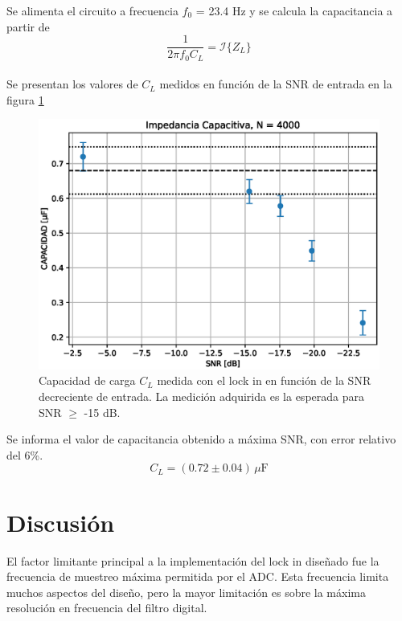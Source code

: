 \documentclass[11pt,a4paper]{extarticle}
\begin{document}
\begin{multicols}{2}
Se alimenta el circuito a frecuencia $f_0$ = 23.4 Hz y se calcula la capacitancia a partir de
\begin{equation*}
	\frac{1}{2\pi f_0 C_L} = \mathcal I \{Z_L\}
\end{equation*}\\[-1em]

Se presentan los valores de $C_L$ medidos en función de la SNR de entrada en la figura \ref{fig:CvsSNR}\\ 

\begin{figure}[H]
	\centering
	\includegraphics[width=\linewidth]{Images/capacitor4000.eps}
	\caption{Capacidad de carga $C_L$ medida con 
	el lock in en función de la SNR decreciente de entrada.
	La medición adquirida es la esperada para SNR $\ge$ -15 dB.}
	\label{fig:CvsSNR}
\end{figure}

Se informa el valor de capacitancia obtenido a máxima SNR, con error relativo del 6\%.
\begin{equation*}
	C_L = \left(0.72 \pm 0.04\right) \, \mu \mathrm F
\end{equation*}

\section{Discusión}

El factor limitante principal a la implementación del lock in diseñado fue la frecuencia de muestreo máxima permitida por el ADC.
Esta frecuencia limita muchos aspectos del diseño, pero la mayor limitación es sobre la máxima resolución en frecuencia del filtro digital.\\


\end{multicols}
\end{document}
